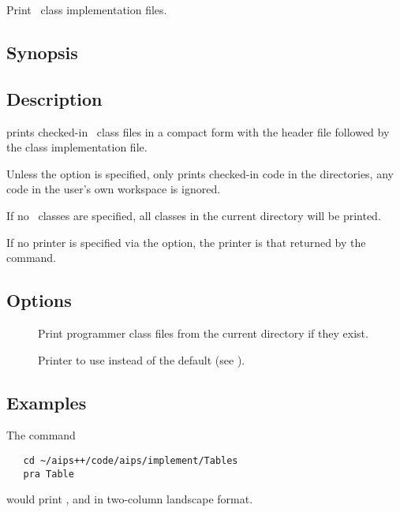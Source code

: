 Print \aipspp\ class implementation files.

\subsection*{Synopsis}

\begin{synopsis}
\end{synopsis}

\subsection*{Description}

 prints checked-in \aipspp\ class files in a compact form with the
header file followed by the class implementation file.

Unless the  option is specified,  only prints checked-in code
in the  directories, any code in the user's own workspace is
ignored.

If no \aipspp\ classes are specified, all classes in the current directory
will be printed.

If no printer is specified via the  option, the printer is that
returned by the  command.

\subsection*{Options}

\begin{description}
\item[]
   Print programmer class files from the current directory if they exist.

\item[]
   Printer to use instead of the default (see ).
\end{description}

\subsection*{Examples}

The command

\begin{verbatim}
   cd ~/aips++/code/aips/implement/Tables
   pra Table
\end{verbatim}

\noindent
would print , and  in two-column landscape
format.

